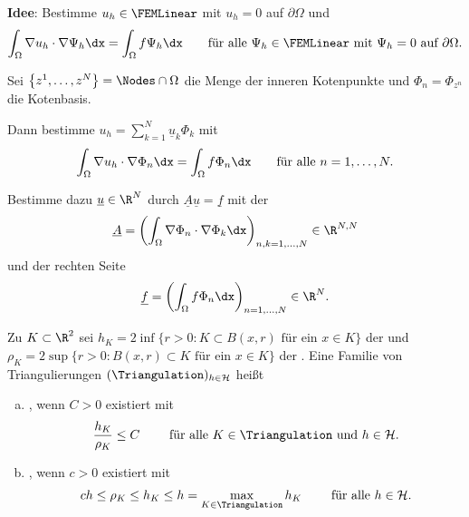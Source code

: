 \textbf{Idee}:
Bestimme $u_h \in \FEMLinear$ mit $u_h = 0$ auf $\partial\Omega$ und
\begin{eqnarray*}
    \int_\Omega \nabla u_h \cdot \nabla \Psi_h \dx = \int_\Omega f \Psi_h \dx
    \qquad \text{für alle } \Psi_h \in \FEMLinear \text{ mit } \Psi_h = 0
    \text{ auf } \partial\Omega.
\end{eqnarray*}

Sei $\left\{z^1, \dots, z^N\right\} = \Nodes \cap \Omega$ die Menge
der inneren Kotenpunkte und $\Phi_n = \Phi_{z^n}$ die Kotenbasis.

Dann bestimme $u_h = \sum_{k=1}^N \underline u_k \Phi_k$ mit
\begin{eqnarray*}
    \int_\Omega \nabla u_h \cdot \nabla \Phi_n \dx = \int_\Omega f \Phi_n \dx
    \qquad \text{für alle } n=1,\dots,N.
\end{eqnarray*}

Bestimme dazu $\underline u \in \R^N$ durch $\underline A \underline u =
\underline f$ mit der 
\begin{eqnarray*}
      \underline A
    = \left(\int_\Omega \nabla \Phi_n \cdot \nabla \Phi_k \dx\right)
      _{n,k=1,\dots,N}\in \R^{N,N}
\end{eqnarray*}
und der rechten Seite
\begin{eqnarray*}
    \underline f = \left(\int_\Omega f \Phi_n \dx\right)_{n=1,\dots,N}\in \R^N.
\end{eqnarray*}


\begin{Definition}
    \label{def:3.9}
    Zu $K \subset \R^2$ sei
    $h_K = 2 \inf\{r>0: K \subset B(x,r) \text{ für ein } x \in K\}$ der  und
    $\rho_K = 2 \sup\{r>0: B(x,r) \subset K \text{ für ein } x \in K\}$ der .
    Eine Familie von Triangulierungen $(\Triangulation)_{h\in \mathcal{H}}$
    heißt
    \begin{enumerate}[a)]
      \item
        , wenn $C>0$ existiert mit
        \begin{eqnarray*}
            \frac{h_K}{\rho_K} \le C
            \qquad \text{ für alle } K\in \Triangulation
            \text{ und } h \in \mathcal{H}.
        \end{eqnarray*}
      \item
        , wenn $c>0$ existiert mit
        \begin{eqnarray*}
            c h \le \rho_K \le h_K \le h = \max_{K\in\Triangulation} h_K
            \qquad \text{ für alle } h \in \mathcal{H}.
        \end{eqnarray*}
    \end{enumerate}
\end{Definition}


